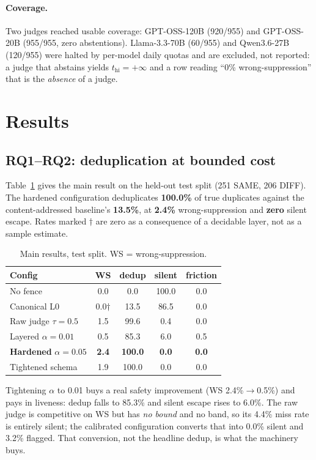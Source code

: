 \documentclass[10pt,twocolumn]{article}
\theoremstyle{definition}
\theoremstyle{remark}
\newcommand{\thi}{t_{\mathrm{hi}}}
\begin{document}
\paragraph{Coverage.} Two judges reached usable coverage: GPT-OSS-120B (920/955)
and GPT-OSS-20B (955/955, zero abstentions). Llama-3.3-70B (60/955) and
Qwen3.6-27B (120/955) were halted by per-model daily quotas and are excluded, not
reported: a judge that abstains yields $\thi=+\infty$ and a row reading ``0\%
wrong-suppression'' that is the \emph{absence} of a judge.

\section{Results}
\label{sec:results}
\subsection{RQ1--RQ2: deduplication at bounded cost}

Table~\ref{tab:main} gives the main result on the held-out test split (251 SAME,
206 DIFF). The hardened configuration deduplicates \textbf{100.0\%} of true
duplicates against the content-addressed baseline's \textbf{13.5\%}, at
\textbf{2.4\%} wrong-suppression and \textbf{zero} silent escape. Rates marked
$\dagger$ are zero as a consequence of a decidable layer, not as a sample
estimate.

\begin{table}[t]
\centering\small
\caption{Main results, test split. WS = wrong-suppression.}
\label{tab:main}
\begin{tabular}{lcccc}
\toprule
Config & WS & dedup & silent & friction \\
\midrule
No fence & 0.0 & 0.0 & 100.0 & 0.0 \\
Canonical L0 & 0.0$\dagger$ & 13.5 & 86.5 & 0.0 \\
Raw judge $\tau{=}0.5$ & 1.5 & 99.6 & 0.4 & 0.0 \\
Layered $\alpha{=}0.01$ & 0.5 & 85.3 & 6.0 & 0.5 \\
\textbf{Hardened} $\alpha{=}0.05$ & \textbf{2.4} & \textbf{100.0} & \textbf{0.0} & \textbf{0.0} \\
Tightened schema & 1.9 & 100.0 & 0.0 & 0.0 \\
\bottomrule
\end{tabular}
\end{table}

Tightening $\alpha$ to 0.01 buys a real safety improvement (WS 2.4\%$\to$0.5\%)
and pays in liveness: dedup falls to 85.3\% and silent escape rises to 6.0\%.
The raw judge is competitive on WS but has \emph{no bound} and no band, so its
4.4\% miss rate is entirely silent; the calibrated configuration converts that
into 0.0\% silent and 3.2\% flagged. That conversion, not the headline dedup, is
what the machinery buys.
\end{document}
